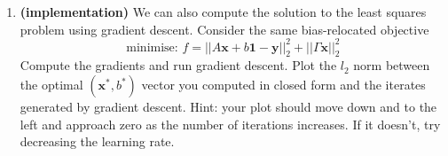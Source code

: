\documentclass[letter,11pt]{article}
\newenvironment{solution}{
    \vspace{0.16in} {\bf Solution:}
    
}{
	\vspace{0.16in}
}
\begin{document}
\begin{enumerate}
\begin{enumerate}
\begin{solution}
            Using $b^*$ to optimise $x$,

            \begin{align*}
                \nabla_x (||A\mathbf{x} + b\mathbf{1} - \mathbf{y}||_2^2 + ||\Gamma\mathbf{x}||_2^2) &= 2A^TA\mathbf{x} + 2bA^T\mathbf{1} - 2A^T\mathbf{y} + 2\Gamma^T\Gamma\mathbf{x} \\
                    &= 2A^TA\mathbf{x} + 2\frac{\mathbf{1}^T(\mathbf{y} - A\mathbf{x})}{n}A^T\mathbf{1} - 2A^T\mathbf{y} + 2\Gamma^T\Gamma\mathbf{x}
            \end{align*}

            Setting $\nabla_x = 0$,

            \begin{align*}
                0 &= (A^TA + \Gamma^T\Gamma)\mathbf{x}^* + \frac{1}{n}\mathbf{1}^T(\mathbf{y} - A\mathbf{x}^*)A^T\mathbf{1} - A^T\mathbf{y} \\
                    &= (A^TA + \Gamma^T\Gamma)\mathbf{x}^* + \frac{1}{n}\mathbf{1}^T\mathbf{y}A^T\mathbf{1} - \frac{1}{n}\mathbf{1}^TA\mathbf{x}^*A^T\mathbf{1} -  A^T\mathbf{y} \\
                    &= (A^TA + \Gamma^T\Gamma)\mathbf{x}^* + \frac{1}{n}A^T\mathbf{1}\mathbf{1}^T\mathbf{y} - \frac{1}{n}A^T\mathbf{1}\mathbf{1}^TA\mathbf{x}^* - A^T\mathbf{y} \\
                    &= (A^TA + \Gamma^T\Gamma - \frac{1}{n}A^T\mathbf{1}\mathbf{1}^TA)\mathbf{x}^* + (\frac{1}{n}A^T\mathbf{1}\mathbf{1}^T - A^T)\mathbf{y} \\
            \end{align*}

            \begin{align*}
                (A^TA + \Gamma^T\Gamma - \frac{1}{n}A^T\mathbf{1}\mathbf{1}^TA)\mathbf{x}^* &= (-\frac{1}{n}A^T\mathbf{1}\mathbf{1}^T + A^T)\mathbf{y} \\
                    &= A^T(\mathbf{I} - \frac{1}{n}\mathbf{1}\mathbf{1}^T)\mathbf{y}
            \end{align*}

            Hence, \[\mathbf{x}^* = (A^TA + \Gamma^T\Gamma - \frac{1}{n}A^T\mathbf{1}\mathbf{1}^TA)^{-1} A^T(\mathbf{I} - \frac{1}{n}\mathbf{1}\mathbf{1}^T)\mathbf{y}\] is the optimal solution for $\mathbf{x}^*$.
        \end{solution}

        \item \textbf{(implementation)} We can also compute the solution to the least squares problem using gradient descent. Consider the same bias-relocated objective \[\text{minimise: } f = ||A\textbf{x} + b\textbf{1} - \textbf{y}||_2^2 + ||\Gamma \textbf{x}||_2^2\] Compute the gradients and run gradient descent. Plot the $l_2$ norm between the optimal $(\textbf{x}^*, b^*)$ vector you computed in closed form and the iterates generated by gradient descent. Hint: your plot should move down and to the left and approach zero as the number of iterations increases. If it doesn't, try decreasing the learning rate.


\end{enumerate}
\end{enumerate}
\end{document}
